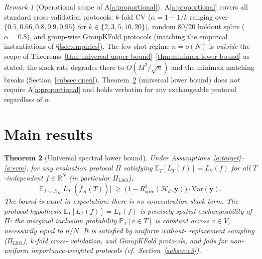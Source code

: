 \documentclass[11pt,a4paper]{article}
\theoremstyle{plain}
\newtheorem{theorem}{Theorem}
\theoremstyle{definition}
\theoremstyle{remark}
\newtheorem{remark}[theorem]{Remark}
\newcommand{\by}{\mathbf{y}}
\newcommand{\E}{\mathbb{E}}
\newcommand{\R}{\mathbb{R}}
\newcommand{\PR}{\mathbb{P}}
\newcommand{\Var}{\mathrm{Var}}
\newcommand{\Rspec}{R^2_{\mathrm{spec}}}
\newcommand{\Acal}{\mathcal{A}}
\newcommand{\Hcal}{\mathcal{H}}
\newcommand{\Dcal}{\mathcal{D}}
\begin{document}
\begin{remark}[Operational scope of A\ref{a:proportional}]
\label{rem:proportional-scope}
A\ref{a:proportional} covers all standard cross-validation
protocols: $k$-fold CV ($\alpha = 1 - 1/k$ ranging over
$\{0.5, 0.66, 0.8, 0.9, 0.95\}$ for $k \in \{2, 3, 5, 10, 20\}$),
random 80/20 holdout splits ($\alpha = 0.8$), and group-wise
GroupKFold protocols (matching the empirical instantiations of
\S\ref{sec:empirics}). The few-shot regime $n = o(N)$ is
\emph{outside} the scope of
Theorems~\ref{thm:universal-upper-bound}--\ref{thm:minimax-lower-bound}
as stated; the slack rate degrades there to $O(M^2/\sqrt{n})$ and
the minimax matching breaks (Section~\ref{subsec:open}).
Theorem~\ref{thm:universal-lower-bound} (universal lower bound)
does \emph{not} require A\ref{a:proportional} and holds verbatim
for any exchangeable protocol regardless of $\alpha$.
\end{remark}

\section{Main results}
\label{sec:main-results}

\begin{theorem}[Universal spectral lower bound]
\label{thm:universal-lower-bound}
Under Assumptions~\ref{a:target}--\ref{a:erm}, for any evaluation
protocol $\Pi$ satisfying $\E_T[L_T(f)] = L_V(f)$ for all
$T$-independent $f \in \R^N$ (in particular $\Pi_{\mathrm{LSO}}$),
\begin{equation}
    \E_{T \sim \Dcal_\Pi}\!\big[L_{T^c}(\hat f_\Acal(T))\big]
    \;\geq\; \big(1 - \Rspec(\Hcal_d, \by)\big) \cdot \Var(\by).
    \label{eq:universal-lower-bound}
\end{equation}
The bound is \emph{exact in expectation}: there is no concentration
slack term.  The protocol hypothesis $\E_T[L_T(f)] = L_V(f)$ is
precisely \emph{spatial exchangeability} of $\Pi$: the marginal
inclusion probability $\PR_T[v \in T]$ is constant across $v \in V$,
necessarily equal to $n/N$.  It is satisfied by uniform without-%
replacement sampling ($\Pi_{\mathrm{LSO}}$), $k$-fold cross-%
validation, and GroupKFold protocols, and fails for non-uniform
importance-weighted protocols (cf.\ Section~\ref{subsec:c3}).
\end{theorem}
\end{document}
